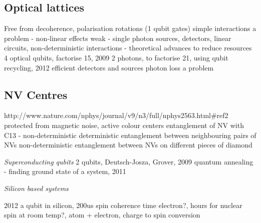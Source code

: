 \subsection{Optical lattices}
Free from decoherence, polarisation rotations (1 qubit gates) simple
interactions a problem - non-linear effects weak
\cite{klm} - single photon sources, detectors, linear circuits, non-deterministic interactions
\cite{science_loqc_review} - theoretical advances to reduce resources
\cite{shor_chip_bristol} 4 optical qubits, factorise 15, 2009
\cite{shor_chip_bristol_2} 2 photons, to factorise 21, using qubit recycling, 2012
efficient detectors \cite{single_photon_detector_review_09} and sources \cite{single_photon_source_review_04}
photon loss a problem

\subsection{NV Centres}
http://www.nature.com/nphys/journal/v9/n3/full/nphys2563.html#ref2
protected from magnetic noise, active colour centers
\cite{two_qubit_nv}
\cite{nv_entanglement_hanson} entanglement of NV with C13 - non-deterministic
\cite{nv_entanglement_wachtrup} deterministic entanglement between neighbouring pairs of NVs
\cite{remote_nv_entanglement_hanson} non-deterministic entanglement between NVs on different pieces of diamond

\textit{Superconducting qubits}
\cite{two_qubit_chip_yale} 2 qubits, Deutsch-Josza, Grover, 2009
\cite{dwave_annealing} quantum annealing - finding ground state of a system, 2011

\textit{Silicon based systems}

\cite{silicon_proposal_98}
\cite{silicon_qubit} 2012 a qubit in silicon, 200us spin coherence time electron?, hours for nuclear spin at room temp?, atom + electron, charge to spin conversion
\cite{silicon_seconds}

